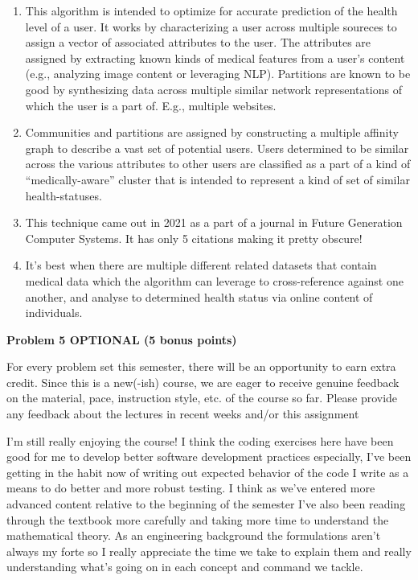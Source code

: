 \documentclass[11pt]{article}
\providecommand{\tightlist}{%
      \setlength{\itemsep}{0pt}\setlength{\parskip}{0pt}}
\begin{document}
\begin{enumerate}
\def\labelenumi{(\alph{enumi})}
\tightlist
\item
  This algorithm is intended to optimize for accurate prediction of the
  health level of a user. It works by characterizing a user across
  multiple soureces to assign a vector of associated attributes to the
  user. The attributes are assigned by extracting known kinds of medical
  features from a user's content (e.g., analyzing image content or
  leveraging NLP). Partitions are known to be good by synthesizing data
  across multiple similar network representations of which the user is a
  part of. E.g., multiple websites.
\item
  Communities and partitions are assigned by constructing a multiple
  affinity graph to describe a vast set of potential users. Users
  determined to be similar across the various attributes to other users
  are classified as a part of a kind of ``medically-aware'' cluster that
  is intended to represent a kind of set of similar health-statuses.
\item
  This technique came out in 2021 as a part of a journal in Future
  Generation Computer Systems. It has only 5 citations making it pretty
  obscure!
\item
  It's best when there are multiple different related datasets that
  contain medical data which the algorithm can leverage to
  cross-reference against one another, and analyse to determined health
  status via online content of individuals.
\end{enumerate}

\begin{problemstmt}
    \textbf{Problem 5 OPTIONAL (5 bonus points)}

For every problem set this semester, there will be an opportunity to
earn extra credit. Since this is a new(-ish) course, we are eager to
receive genuine feedback on the material, pace, instruction style, etc.
of the course so far. Please provide any feedback about the lectures in
recent weeks and/or this assignment
\end{problemstmt}

    I'm still really enjoying the course! I think the coding exercises here
have been good for me to develop better software development practices
especially, I've been getting in the habit now of writing out expected
behavior of the code I write as a means to do better and more robust
testing. I think as we've entered more advanced content relative to the
beginning of the semester I've also been reading through the textbook
more carefully and taking more time to understand the mathematical
theory. As an engineering background the formulations aren't always my
forte so I really appreciate the time we take to explain them and really
understanding what's going on in each concept and command we tackle.
\end{document}

